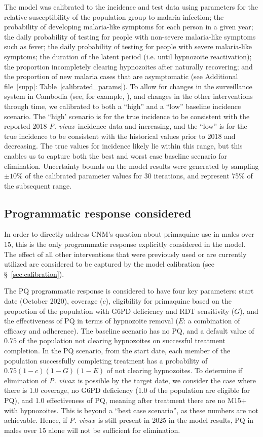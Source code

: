 \documentclass[doublespacing]{bmcart}
\newcommand{\pv}{\textit{P. vivax}}
\begin{document}
The model was calibrated to the incidence and test data using parameters for the relative susceptibility of the population group to malaria infection; the probability of developing malaria-like symptoms for each person in a given year; the daily probability of testing for people with non-severe malaria-like symptoms such as fever; the daily probability of testing for people with severe malaria-like symptoms; the duration of the latent period (i.e. until hypnozoite reactivation); the proportion incompletely clearing hypnozoites after naturally recovering; and the proportion of new malaria cases that are asymptomatic (see Additional file~\ref{supp}: Table~\ref{calibrated_params}). To allow for changes in the surveillance system in Cambodia (see, for example, \cite{Pengby}), and changes in the other interventions through time, we calibrated to both a ``high'' and a ``low'' baseline incidence scenario. The ``high' scenario is for the true incidence to be consistent with the reported 2018 \pv~incidence data and increasing, and the ``low'' is for the true incidence to be consistent with the historical values prior to 2018 and decreasing. The true values for incidence likely lie within this range, but this enables us to capture both the best and worst case baseline scenario for elimination. Uncertainty bounds on the model results were generated by sampling $\pm10\%$ of the calibrated parameter values for 30 iterations, and represent 75\% of the subsequent range.

\subsection*{Programmatic response considered}
In order to directly address CNM's question about primaquine use in males over 15, this is the only programmatic response explicitly considered in the model. The effect of all other interventions that were previously used or are currently utilized are considered to be captured by the model calibration (see \S~\ref{sec:calibration}).

The PQ programmatic response is considered to have four key parameters: start date (October 2020), coverage ($c$), eligibility for primaquine based on the proportion of the population with G6PD deficiency and RDT sensitivity ($G$), and the effectiveness of PQ in terms of hypnozoite removal ($E$: a combination of efficacy and adherence). The baseline scenario has no PQ, and a default value of $0.75$ of the population not clearing hypnozoites on successful treatment completion. In the PQ scenario, from the start date, each member of the population successfully completing treatment has a probability of $0.75(1-c)(1-G)(1-E)$ of not clearing hypnozoites.  To determine if elimination of \pv~is possible by the target date, we consider the case where there is 1.0 coverage, no G6PD deficiency (1.0 of the population are eligible for PQ), and 1.0 effectiveness of PQ, meaning after treatment there are no M15+ with hypnozoites. This is beyond a ``best case scenario'', as these numbers are not achievable. Hence, if \pv~is still present in 2025 in the model results, PQ in males over 15 alone will not be sufficient for elimination.  
\end{document}
